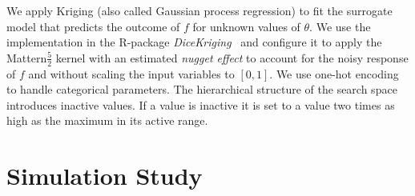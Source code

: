 \documentclass[bimj,fleqn]{w-art}
\theoremstyle{plain}
\theoremstyle{definition}
\begin{document}
We apply Kriging (also called Gaussian process regression) to fit the surrogate model that predicts the outcome of $f$ for unknown values of $\theta$.
We use the implementation in the R-package \emph{DiceKriging}~\citep{roustant_dicekriging_2012} and configure it to apply the Mattern$\frac{5}{2}$ kernel with an estimated \emph{nugget effect} to account for the noisy response of $f$ and without scaling the input variables to $[0,1]$.
We use one-hot encoding to handle categorical parameters.
The hierarchical structure of the search space introduces inactive values.
If a value is inactive it is set to a value two times as high as the maximum in its active range.

\section{Simulation Study}
\end{document}
